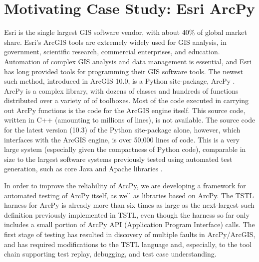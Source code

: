 \section{Motivating Case Study: Esri ArcPy}
\label{sec:arcpy}

Esri is the single largest GIS software vendor, with about 40\% of
global market share.  Esri's ArcGIS tools are extremely widely used
for GIS analysis, in government, scientific research, commercial
enterprises, and education.  Automation of complex GIS analysis and
data management is essential, and Esri has long provided tools for
programming their GIS software tools.  The newest such method,
introduced in ArcGIS 10.0, is a Python site-package, ArcPy
\cite{ArcPy}.  ArcPy is a complex library, with dozens of classes and
hundreds of functions distributed over a variety of of toolboxes.
Most of the code executed in carrying out ArcPy functions is the code
for the ArcGIS engine itself.  This source code, written in C++
(amounting to millions of lines), is
not available.  The source code for the latest version (10.3) of the
Python site-package alone, however, which interfaces with the ArcGIS
engine, is over 50,000 lines of code.  This is a very large system
(especially given the compactness of Python code), comparable in size
to the largest software systems previously tested using automated test
generation, such as core Java and Apache libraries
\cite{FA11,Pacheco}.

In order to improve the reliability of ArcPy, we are developing a
framework for automated testing of ArcPy itself, as well as libraries
based on ArcPy.  The TSTL harness for ArcPy is already more than six times as
large as the next-largest such definition previously implemented in
TSTL, even though the harness so far only includes a small portion of ArcPy
API (Application Program Interface) calls. The first stage of testing has resulted in discovery of
multiple faults in ArcPy/ArcGIS, and has required modifications to the
TSTL language and, especially, to the tool chain supporting test replay,
debugging, and test case understanding.



